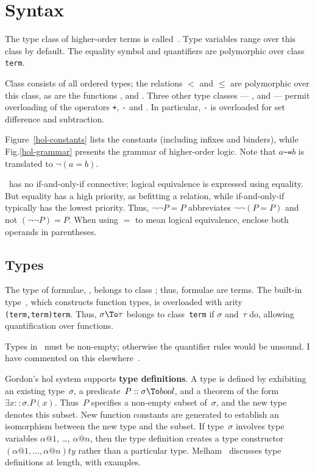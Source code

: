 \section{Syntax}
The type class of higher-order terms is called~.  Type variables
range over this class by default.  The equality symbol and quantifiers are
polymorphic over class {\tt term}.

Class  consists of all ordered types; the relations $<$ and
$\leq$ are polymorphic over this class, as are the functions
,  and .  Three other
type classes --- ,  and  --- permit
overloading of the operators {\tt+}, {\tt-} and {\tt*}.  In particular,
{\tt-} is overloaded for set difference and subtraction.

Figure~\ref{hol-constants} lists the constants (including infixes and
binders), while Fig.\ts\ref{hol-grammar} presents the grammar of
higher-order logic.  Note that $a$\verb|~=|$b$ is translated to
$\neg(a=b)$.

\begin{warn}
  \HOL\ has no if-and-only-if connective; logical equivalence is expressed
  using equality.  But equality has a high priority, as befitting a
  relation, while if-and-only-if typically has the lowest priority.  Thus,
  $\neg\neg P=P$ abbreviates $\neg\neg (P=P)$ and not $(\neg\neg P)=P$.
  When using $=$ to mean logical equivalence, enclose both operands in
  parentheses.
\end{warn}

\subsection{Types}\label{HOL-types}
The type of formulae, , belongs to class ; thus,
formulae are terms.  The built-in type~, which constructs function
types, is overloaded with arity {\tt(term,term)term}.  Thus, $\sigma\To\tau$
belongs to class~{\tt term} if $\sigma$ and~$\tau$ do, allowing quantification
over functions.

Types in \HOL\ must be non-empty; otherwise the quantifier rules would be
unsound.  I have commented on this elsewhere~\cite[\S7]{paulson-COLOG}.

Gordon's {\sc hol} system supports {\bf type definitions}.  A type is
defined by exhibiting an existing type~$\sigma$, a predicate~$P::\sigma\To
bool$, and a theorem of the form $\exists x::\sigma.P(x)$.  Thus~$P$
specifies a non-empty subset of~$\sigma$, and the new type denotes this
subset.  New function constants are generated to establish an isomorphism
between the new type and the subset.  If type~$\sigma$ involves type
variables $\alpha@1$, \ldots, $\alpha@n$, then the type definition creates
a type constructor $(\alpha@1,\ldots,\alpha@n)ty$ rather than a particular
type.  Melham~\cite{melham89} discusses type definitions at length, with
examples. 

